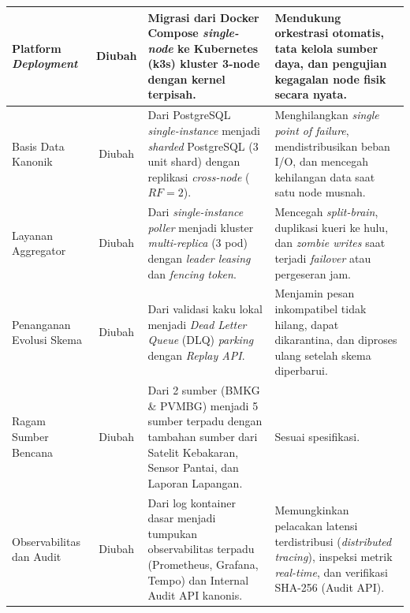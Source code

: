 \begin{small}
\begin{xltabular}{\textwidth}{p{3.2cm} c p{4cm} X}
Platform \textit{Deployment} & Diubah & Migrasi dari Docker Compose \textit{single-node} ke Kubernetes (k3s) kluster 3-node dengan kernel terpisah. & Mendukung orkestrasi otomatis, tata kelola sumber daya, dan pengujian kegagalan node fisik secara nyata. \\
\midrule
Basis Data Kanonik & Diubah & Dari PostgreSQL \textit{single-instance} menjadi \textit{sharded} PostgreSQL (3 unit shard) dengan replikasi \textit{cross-node} ($RF=2$). & Menghilangkan \textit{single point of failure}, mendistribusikan beban I/O, dan mencegah kehilangan data saat satu node musnah. \\
\midrule
Layanan Aggregator & Diubah & Dari \textit{single-instance poller} menjadi kluster \textit{multi-replica} (3 pod) dengan \textit{leader leasing} dan \textit{fencing token}. & Mencegah \textit{split-brain}, duplikasi kueri ke hulu, dan \textit{zombie writes} saat terjadi \textit{failover} atau pergeseran jam. \\
\midrule
Penanganan Evolusi Skema & Diubah & Dari validasi kaku lokal menjadi \textit{Dead Letter Queue} (DLQ) \textit{parking} dengan \textit{Replay API}. & Menjamin pesan inkompatibel tidak hilang, dapat dikarantina, dan diproses ulang setelah skema diperbarui. \\
\midrule
Ragam Sumber Bencana & Diubah & Dari 2 sumber (BMKG \& PVMBG) menjadi 5 sumber terpadu dengan tambahan sumber dari Satelit Kebakaran, Sensor Pantai, dan Laporan Lapangan. & Sesuai spesifikasi. \\
\midrule
Observabilitas dan Audit & Diubah & Dari log kontainer dasar menjadi tumpukan observabilitas terpadu (Prometheus, Grafana, Tempo) dan Internal Audit API kanonis. & Memungkinkan pelacakan latensi terdistribusi (\textit{distributed tracing}), inspeksi metrik \textit{real-time}, dan verifikasi SHA-256 (Audit API). \\
\end{xltabular}
\end{small}
